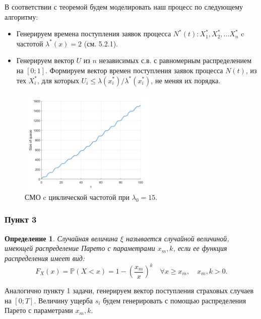 \documentclass[oneside, final, 12pt]{article}
\newtheorem{definition}{Определение}
\begin{document}
	\vspace{5mm}\noindent 
	В соответствии с теоремой будем моделировать наш процесс по следующему алгоритму:
	\begin{itemize}
		\item Генерируем времена поступления заявок процесса $N^*(t): X^*_1, X^*_2,\ldots X^*_n$ 
			c частотой $\lambda^*(x) = 2$ (см. 5.2.1).
		\item Генерируем вектор $U$ из $n$ независимых с.в. с равномерным распределением на $[0;1]$. 
			Формируем вектор времен поступления заявок процесса $N(t)$, из тех $X^*_i$, 
			для которых  $U_i \leqslant \lambda(x^*_i) \slash \lambda^*(x^*_i)$, не меняя их порядка. 
	\end{itemize}
	
	\begin{figure}[h!]
		\centering
		\includegraphics[width=0.6\textwidth]{../code/Task_11/pict/nonhom_1500_ex.png}
		\caption{СМО c циклической частотой при $\lambda_0 =  15$.}
    \end{figure}
    
\newpage
\subsubsection{Пункт 3}
	
	\begin{definition}
		Случайная величина $\xi$ называется случайной величиной, имеющей распределение Парето
		 с параметрами $x_m, k$, если ее функция распределения имеет вид:
		 $$ F_X(x) = \mathbb{P}(X<x) = 1- \left( \frac{x_m}{x}\right)^k 
		 \quad \forall x\geqslant x_m, \quad x_m, k> 0.$$
	\end{definition}
	\noindent
	Аналогично пункту 1 задачи, генерируем вектор поступления страховых случаев на $[0;T]$.
	\newline
	Величину ущерба $s_i$ будем генерировать с помощью распределения Парето с параметрами $x_m, k$.
	
\end{document}
